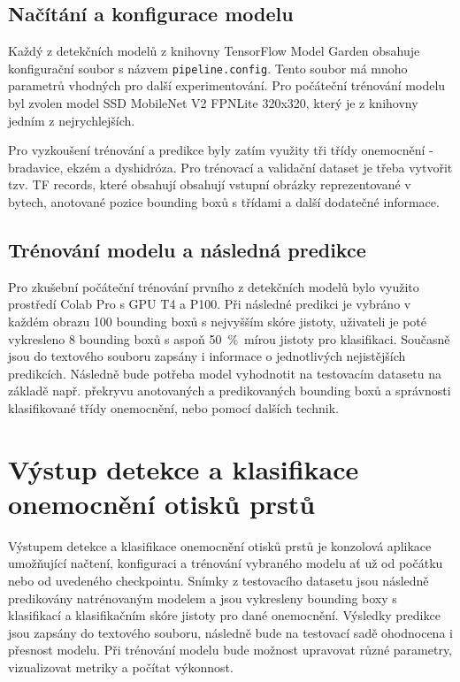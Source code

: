 \subsection{Načítání a konfigurace modelu}
Každý z detekčních modelů z knihovny TensorFlow Model Garden obsahuje konfigurační soubor s názvem \verb=pipeline.config=. Tento soubor má mnoho parametrů vhodných pro další experimentování. Pro počáteční trénování modelu byl zvolen model SSD MobileNet V2 FPNLite 320x320, který je z knihovny jedním z nejrychlejších.

Pro vyzkoušení trénování a predikce byly zatím využity tři třídy onemocnění - bradavice, ekzém a dyshidróza. Pro trénovací a validační dataset je třeba vytvořit tzv. TF records, které obsahují obsahují vstupní obrázky reprezentované v bytech, anotované pozice bounding boxů s třídami a další dodatečné informace.

\subsection{Trénování modelu a následná predikce}
Pro zkušební počáteční trénování prvního z detekčních modelů bylo využito prostředí Colab Pro s GPU T4 a P100. Při následné predikci je vybráno v každém obrazu 100 bounding boxů s nejvyšším skóre jistoty, uživateli je poté vykresleno 8 bounding boxů s aspoň 50~\%~mírou jistoty pro klasifikaci. Současně jsou do textového souboru zapsány i informace o jednotlivých nejistějších predikcích. Následně bude potřeba model vyhodnotit na testovacím datasetu na základě např. překryvu anotovaných a predikovaných bounding boxů a správnosti klasifikované třídy onemocnění, nebo pomocí dalších technik.


\section{Výstup detekce a klasifikace onemocnění otisků prstů}
Výstupem detekce a klasifikace onemocnění otisků prstů je konzolová aplikace umožňující načtení, konfiguraci a trénování vybraného modelu ať už od počátku nebo od uvedeného checkpointu. Snímky z testovacího datasetu jsou následně predikovány natrénovaným modelem a jsou vykresleny bounding boxy s klasifikací a klasifikačním skóre jistoty pro dané onemocnění. Výsledky predikce jsou zapsány do textového souboru, následně bude na testovací sadě ohodnocena i přesnost modelu. Při trénování modelu bude možnost upravovat různé parametry, vizualizovat metriky a počítat výkonnost.

